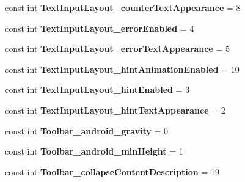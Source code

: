 \begin{DoxyCompactItemize}
\item 
\mbox{\label{classXaria_1_1Resource_1_1Styleable_ab44b9b4d557988a3a6c9e6b5790e0315}} 
const int {\bfseries Text\+Input\+Layout\+\_\+counter\+Text\+Appearance} = 8
\item 
\mbox{\label{classXaria_1_1Resource_1_1Styleable_a7a5010af4c65edeaae82ed84d827f8e7}} 
const int {\bfseries Text\+Input\+Layout\+\_\+error\+Enabled} = 4
\item 
\mbox{\label{classXaria_1_1Resource_1_1Styleable_a372db0491d307d768a15f4fbf171ea25}} 
const int {\bfseries Text\+Input\+Layout\+\_\+error\+Text\+Appearance} = 5
\item 
\mbox{\label{classXaria_1_1Resource_1_1Styleable_a2d93673fe7974a8506daeab140caf136}} 
const int {\bfseries Text\+Input\+Layout\+\_\+hint\+Animation\+Enabled} = 10
\item 
\mbox{\label{classXaria_1_1Resource_1_1Styleable_a3daa98bfc06f7c4c9b5ec5e1335c3e9d}} 
const int {\bfseries Text\+Input\+Layout\+\_\+hint\+Enabled} = 3
\item 
\mbox{\label{classXaria_1_1Resource_1_1Styleable_ad03379fdaf1c6650e0397f3b3fea7cf3}} 
const int {\bfseries Text\+Input\+Layout\+\_\+hint\+Text\+Appearance} = 2
\item 
\mbox{\label{classXaria_1_1Resource_1_1Styleable_a1ab8e1df66e0cc7507347fe3c2fa94c0}} 
const int {\bfseries Toolbar\+\_\+android\+\_\+gravity} = 0
\item 
\mbox{\label{classXaria_1_1Resource_1_1Styleable_abef1df0ffb4a6f5d0c1fdb33b4cb09e3}} 
const int {\bfseries Toolbar\+\_\+android\+\_\+min\+Height} = 1
\item 
\mbox{\label{classXaria_1_1Resource_1_1Styleable_a434eee3689ffd3985854502397f3d726}} 
const int {\bfseries Toolbar\+\_\+collapse\+Content\+Description} = 19
\item 

\end{DoxyCompactItemize}
